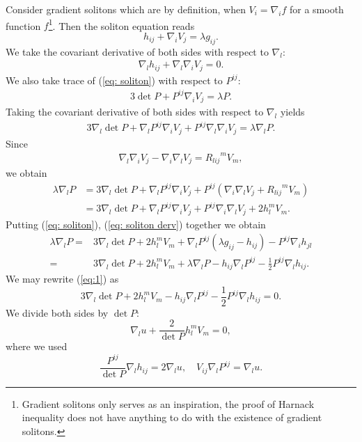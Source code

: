 \documentclass{amsart}
\theoremstyle{definition}
\theoremstyle{remark}
\numberwithin{equation}{section}
\begin{document}
Consider gradient solitons which are by definition, when $V_i=\nabla_if$ for a smooth function $f$\footnote{Gradient solitons only serves as an inspiration, the proof of Harnack inequality does not have anything to do with the existence of gradient solitons.}. Then the soliton equation reads
\begin{equation}\label{eq: soliton}
h_{ij}+\nabla_iV_j=\lambda g_{ij}.
\end{equation}
We take the covariant derivative of both sides with respect to $\nabla_l:$
\begin{align}\label{eq: soliton derv}
\nabla_lh_{ij}+\nabla_l\nabla_iV_j=0.
\end{align}
We also take trace of (\ref{eq: soliton}) with respect to $P^{ij}$:
\begin{align*}
3\det P+P^{ij}\nabla_iV_j=\lambda P.
\end{align*}
Taking the covariant derivative of both sides with respect to $\nabla_l$ yields
\begin{align*}
3\nabla_l\det P+\nabla_l P^{ij}\nabla_iV_j+P^{ij}\nabla_l\nabla_iV_j=\lambda \nabla_l P.
\end{align*}
Since
\begin{align}\label{eq: soliton derv 2}
\nabla_l\nabla_iV_j-\nabla_i\nabla_lV_j={R_{lij}}^mV_m,
\end{align}
we obtain
\begin{align*}
\lambda \nabla_l P&=3\nabla_l\det P+\nabla_l P^{ij}\nabla_iV_j+P^{ij}(\nabla_i\nabla_lV_j+{R_{lij}}^mV_m)\\
&=3\nabla_l\det P+\nabla_l P^{ij}\nabla_iV_j+P^{ij}\nabla_i\nabla_lV_j+2h_l^mV_m.
\end{align*}
Putting (\ref{eq: soliton}), (\ref{eq: soliton derv}) together we obtain
\begin{align}\label{eq:1}
\lambda \nabla_l P
=&3\nabla_l\det P+2h_l^mV_m+\nabla_l P^{ij}(\lambda g_{ij}-h_{ij})-P^{ij}\nabla_ih_{jl}\\
=&3\nabla_l\det P+2h_l^mV_m+\lambda \nabla_l P-h_{ij}\nabla_l P^{ij}-\frac{1}{2}P^{ij}\nabla_lh_{ij}.\nonumber
\end{align}
We may rewrite (\ref{eq:1}) as
\[3\nabla_l\det P+2h_l^mV_m-h_{ij}\nabla_l P^{ij}-\frac{1}{2}P^{ij}\nabla_lh_{ij}=0.\]
We divide both sides by $\det P:$
\begin{equation}\label{eq:a}
\nabla_lu+\frac{2}{\det P}h_l^mV_m=0,
\end{equation}
where we used
\begin{equation*}
\frac{P^{ij}}{\det P}\nabla_lh_{ij}=2\nabla_lu,\quad V_{ij}\nabla_lP^{ij}=\nabla_lu.
\end{equation*}
\end{document}
